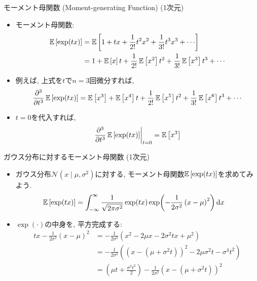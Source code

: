 \documentclass[dvipdfmx,notheorems,t]{beamer}
\begin{document}
\begin{frame}{モーメント母関数 (Moment-generating Function) (1次元)}
\begin{itemize}
  \item モーメント母関数:
  \begin{align*}
    \E{\exp(tx)} &= \E{1 + tx + \frac{1}{2!} t^2 x^2 + \frac{1}{3!} t^3 x^3 + \cdots} \\
    &= 1 + \E{x} t + \frac{1}{2!} \E{x^2} t^2 + \frac{1}{3!} \E{x^3} t^3 + \cdots
  \end{align*}
  \item 例えば, 上式を$t$で$n = 3$回微分すれば,
  \begin{align*}
    \pdv[3]{t} \operatorname{\mathbb{E}} \left[ \exp(tx) \right] = \operatorname{\mathbb{E}} \left[ x^3 \right] + \operatorname{\mathbb{E}} \left[ x^4 \right] t
      + \frac{1}{2!} \operatorname{\mathbb{E}} \left[ x^5 \right] t^2 + \frac{1}{3!} \operatorname{\mathbb{E}} \left[ x^6 \right] t^3 + \cdots
  \end{align*}
  \item $t = 0$を代入すれば,
  \begin{align*}
    \left. \pdv[3]{t} \operatorname{\mathbb{E}} \left[ \exp(tx) \right] \right|_{t = 0} = \operatorname{\mathbb{E}} \left[ x^3 \right]
  \end{align*}
\end{itemize}
\end{frame}

\begin{frame}{ガウス分布に対するモーメント母関数 (1次元)}
\begin{itemize}
  \item ガウス分布$\mathcal{N}(x \mid \mu, \sigma^2)$に対する, モーメント母関数$\operatorname{\mathbb{E}} \left[ \exp(tx) \right]$を求めてみよう.
  \begin{align*}
    \operatorname{\mathbb{E}} \left[ \exp(tx) \right] &= \int_{-\infty}^\infty \frac{1}{\sqrt{2\pi \sigma^2}} \exp(tx)
      \exp(-\frac{1}{2 \sigma^2} \left( x - \mu \right)^2) \dd{x}
  \end{align*}
  \item $\exp(\cdot)$の中身を, 平方完成する:
  \begin{align*}
    tx - \frac{1}{2 \sigma^2} \left( x - \mu \right)^2
    &= -\frac{1}{2 \sigma^2} \left( x^2 - 2 \mu x - 2 \sigma^2 tx + \mu^2 \right) \\
    &= -\frac{1}{2 \sigma^2} \left( \left( x - \left( \mu + \sigma^2 t \right) \right)^2
      - 2 \mu \sigma^2 t - \sigma^4 t^2 \right) \\
    &= \left( \mu t + \frac{\sigma^2 t^2}{2} \right)
      -\frac{1}{2 \sigma^2} \left( x - \left( \mu + \sigma^2 t \right) \right)^2
  \end{align*}
\end{itemize}
\end{frame}
\end{document}
